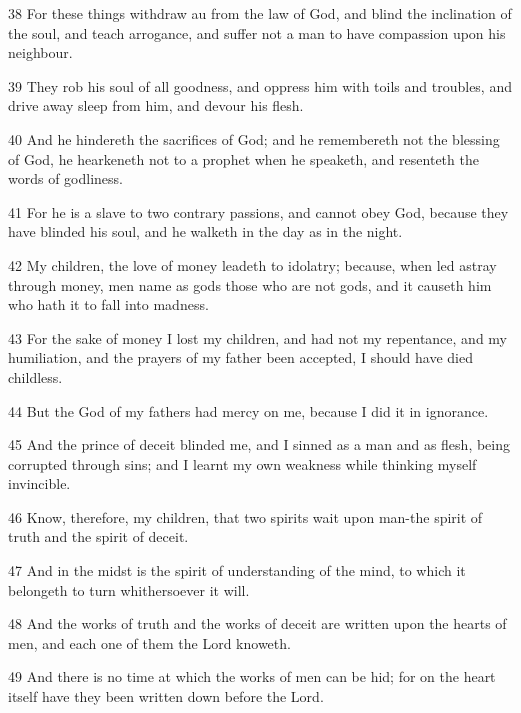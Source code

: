 \par 38 For these things withdraw au from the law of God, and blind the inclination of the soul, and teach arrogance, and suffer not a man to have compassion upon his neighbour.

\par 39 They rob his soul of all goodness, and oppress him with toils and troubles, and drive away sleep from him, and devour his flesh.

\par 40 And he hindereth the sacrifices of God; and he remembereth not the blessing of God, he hearkeneth not to a prophet when he speaketh, and resenteth the words of godliness.

\par 41 For he is a slave to two contrary passions, and cannot obey God, because they have blinded his soul, and he walketh in the day as in the night.

\par 42 My children, the love of money leadeth to idolatry; because, when led astray through money, men name as gods those who are not gods, and it causeth him who hath it to fall into madness.

\par 43 For the sake of money I lost my children, and had not my repentance, and my humiliation, and the prayers of my father been accepted, I should have died childless.

\par 44 But the God of my fathers had mercy on me, because I did it in ignorance.

\par 45 And the prince of deceit blinded me, and I sinned as a man and as flesh, being corrupted through sins; and I learnt my own weakness while thinking myself invincible.

\par 46 Know, therefore, my children, that two spirits wait upon man-the spirit of truth and the spirit of deceit.

\par 47 And in the midst is the spirit of understanding of the mind, to which it belongeth to turn whithersoever it will.

\par 48 And the works of truth and the works of deceit are written upon the hearts of men, and each one of them the Lord knoweth.

\par 49 And there is no time at which the works of men can be hid; for on the heart itself have they been written down before the Lord.

